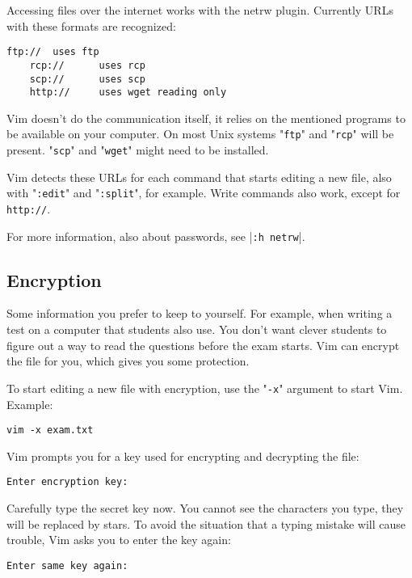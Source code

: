 Accessing files over the internet works with the netrw plugin.
Currently URLs with these formats are recognized:

\begin{Verbatim}[samepage=true]
    ftp:// 	uses ftp
    rcp://      uses rcp
    scp://      uses scp
    http:// 	uses wget reading only
\end{Verbatim}

Vim doesn't do the communication itself, it relies on the mentioned programs to be available on your computer.
On most Unix systems "\texttt{ftp}" and "\texttt{rcp}" will be present.
"\texttt{scp}" and "\texttt{wget}" might need to be installed.

Vim detects these URLs for each command that starts editing a new file, also with "\texttt{:edit}" and "\texttt{:split}", for example.
Write commands also work, except for \texttt{http://}.

For more information, also about passwords, see |\texttt{:h netrw}|.
\subsection{Encryption}
Some information you prefer to keep to yourself.
For example, when writing a test on a computer that students also use.
You don't want clever students to figure out a way to read the questions before the exam starts.
Vim can encrypt the file for you, which gives you some protection.

To start editing a new file with encryption, use the "\texttt{-x}" argument to start Vim.
Example:

\begin{Verbatim}[samepage=true]
 vim -x exam.txt
\end{Verbatim}

Vim prompts you for a key used for encrypting and decrypting the file:

\begin{Verbatim}[samepage=true]
    Enter encryption key: 
\end{Verbatim}

Carefully type the secret key now.
You cannot see the characters you type, they will be replaced by stars.
To avoid the situation that a typing mistake will cause trouble, Vim asks you to enter the key again:

\begin{Verbatim}[samepage=true]
    Enter same key again: 
\end{Verbatim}


